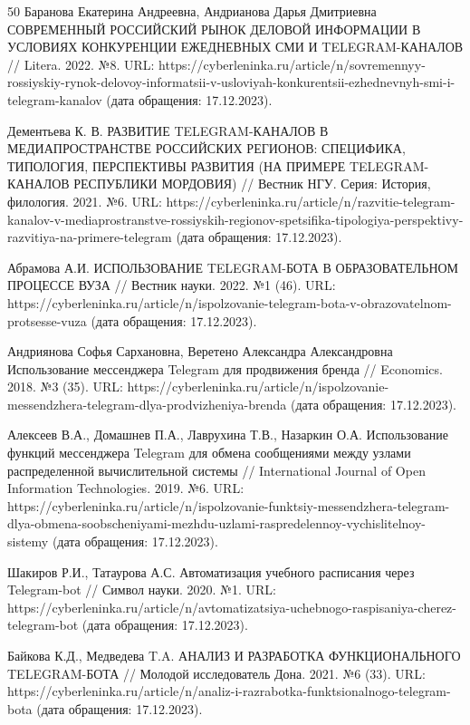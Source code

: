 \documentclass{article}
\begin{document}
\begin{thebibliography} {50}
Баранова Екатерина Андреевна, Андрианова Дарья Дмитриевна СОВРЕМЕННЫЙ РОССИЙСКИЙ РЫНОК ДЕЛОВОЙ ИНФОРМАЦИИ В УСЛОВИЯХ КОНКУРЕНЦИИ ЕЖЕДНЕВНЫХ СМИ И TELEGRAM-КАНАЛОВ // Litera. 2022. №8. URL: https://cyberleninka.ru/article/n/sovremennyy-rossiyskiy-rynok-delovoy-informatsii-v-usloviyah-konkurentsii-ezhednevnyh-smi-i-telegram-kanalov (дата обращения: 17.12.2023).

Дементьева К. В. РАЗВИТИЕ TELEGRAM-КАНАЛОВ В МЕДИАПРОСТРАНСТВЕ РОССИЙСКИХ РЕГИОНОВ: СПЕЦИФИКА, ТИПОЛОГИЯ, ПЕРСПЕКТИВЫ РАЗВИТИЯ (НА ПРИМЕРЕ TELEGRAM-КАНАЛОВ РЕСПУБЛИКИ МОРДОВИЯ) // Вестник НГУ. Серия: История, филология. 2021. №6. URL: https://cyberleninka.ru/article/n/razvitie-telegram-kanalov-v-mediaprostranstve-rossiyskih-regionov-spetsifika-tipologiya-perspektivy-razvitiya-na-primere-telegram (дата обращения: 17.12.2023).

Абрамова А.И. ИСПОЛЬЗОВАНИЕ TELEGRAM-БОТА В ОБРАЗОВАТЕЛЬНОМ ПРОЦЕССЕ ВУЗА // Вестник науки. 2022. №1 (46). URL: https://cyberleninka.ru/article/n/ispolzovanie-telegram-bota-v-obrazovatelnom-protsesse-vuza (дата обращения: 17.12.2023).

Андриянова Софья Сархановна, Веретено Александра Александровна Использование мессенджера Telegram для продвижения бренда // Economics. 2018. №3 (35). URL: https://cyberleninka.ru/article/n/ispolzovanie-messendzhera-telegram-dlya-prodvizheniya-brenda (дата обращения: 17.12.2023).

Алексеев В.А., Домашнев П.А., Лаврухина Т.В., Назаркин О.А. Использование функций мессенджера Telegram для обмена сообщениями между узлами распределенной вычислительной системы // International Journal of Open Information Technologies. 2019. №6. URL: https://cyberleninka.ru/article/n/ispolzovanie-funktsiy-messendzhera-telegram-dlya-obmena-soobscheniyami-mezhdu-uzlami-raspredelennoy-vychislitelnoy-sistemy (дата обращения: 17.12.2023).

Шакиров Р.И., Татаурова А.С. Автоматизация учебного расписания через Telegram-bot // Символ науки. 2020. №1. URL: https://cyberleninka.ru/article/n/avtomatizatsiya-uchebnogo-raspisaniya-cherez-telegram-bot (дата обращения: 17.12.2023).

Байкова К.Д., Медведева T.A. АНАЛИЗ И РАЗРАБОТКА ФУНКЦИОНАЛЬНОГО TELEGRAM-БОТА // Молодой исследователь Дона. 2021. №6 (33). URL: https://cyberleninka.ru/article/n/analiz-i-razrabotka-funktsionalnogo-telegram-bota (дата обращения: 17.12.2023).


\end{thebibliography}
\end{document}
